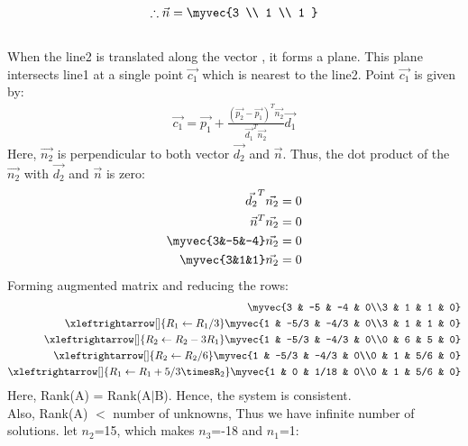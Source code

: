 \documentclass[journal,12pt,twocolumn]{IEEEtran}
\begin{document}
\begin{align}
    \therefore \vec{n}=\myvec{3 \\ 1 \\ 1 }
\end{align}
\\
When the line2 is translated along the vector , it forms a plane. This plane intersects line1 at a single point $\vec{c_1}$ which is nearest to the line2. Point $\vec{c_1}$ is given by:
\\
\begin{align}
\vec{c_1}=\vec{p_1}+\frac{(\vec{p_2}-\vec{p_1})^T \vec{n_2}}{\vec{d_1}^T \vec{n_2}}\vec{d_1} 
\end{align}
Here, $\Vec{n_2}$ is perpendicular to both vector $\Vec{d_2}$ and $\Vec{n}$. Thus, the dot product of the $\Vec{n_2}$ with $\Vec{d_2}$ and $\Vec{n}$ is zero:
\begin{align}
    \vec{d_2}^T\vec{n_2} =  0\\
    \vec{n}^T\vec{n_2} =  0\\
    \myvec{3&-5&-4}\vec{n_2}=0\\
    \myvec{3&1&1}\vec{n_2}=0
\end{align}
Forming augmented matrix and reducing the rows:
\begin{align}
\myvec{3 & -5 & -4 & 0\\3 & 1 & 1 & 0}\\
\xleftrightarrow[]{R_1\leftarrow R_1/3}
\myvec{1 & -5/3 & -4/3 & 0\\3 & 1 & 1 & 0}\\
\xleftrightarrow[]{R_2\leftarrow R_2-3R_1}
\myvec{1 & -5/3 & -4/3 & 0\\0 & 6 & 5 & 0}\\
\xleftrightarrow[]{R_2\leftarrow R_2/6}
\myvec{1 & -5/3 & -4/3 & 0\\0 & 1 & 5/6 & 0}\\
\xleftrightarrow[]{R_1\leftarrow R_1+5/3\timesR_2}
\myvec{1 & 0 & 1/18 & 0\\0 & 1 & 5/6 & 0}
\end{align} 
Here, Rank(A) = Rank(A$\mid$B). Hence, the system is consistent. 
\\
Also, Rank(A) $<$ number of unknowns, Thus we have infinite number of solutions. let $n_2$=15, which makes $n_3$=-18 and $n_1$=1:
\end{document}
